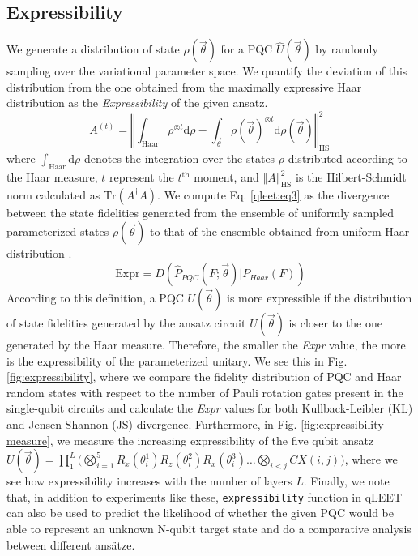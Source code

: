 \documentclass[%
 reprint,
 amsmath,
 amssymb,
 showkeys,
 pra,
 floatfix,
]{revtex4-2}
\begin{document}
\subsection{Expressibility}

We generate a distribution of state $\rho(\vec{\theta})$ for a PQC $\hat{U}(\vec{\theta})$ by randomly sampling over the variational parameter space. We quantify the deviation of this distribution from the one obtained from the maximally expressive Haar distribution as the \textit{Expressibility} of the given ansatz.
\begin{equation}\label{qleet:eq3}
    A^{(t)} =\left\Vert \int_\text{Haar}\rho^{\otimes t} \text{d}\rho - \int_{\vec{\theta}}\rho(\vec{\theta})^{\otimes t} \text{d}\rho(\vec{\theta}) \right\Vert_\text{HS}^2\,
\end{equation}
where $\int_\text{Haar}\text{d}\rho$ denotes the integration over the states $\rho$ distributed according to the Haar measure, $t$ represent the $t^{\text{th}}$ moment,  and $\left\Vert A \right\Vert_\text{HS}^2$ is the Hilbert-Schmidt norm calculated as $\text{Tr}(A^\dagger A)$. We compute Eq. \ref{qleet:eq3} as the divergence between the state fidelities generated from the ensemble of uniformly sampled parameterized states $\rho(\vec{\theta})$ to that of the ensemble obtained from uniform Haar distribution \cite{10.1002/qute.201900070}.
\begin{equation}
    \text{Expr} = D(\hat{P}_{PQC}(F; \vec{\theta}) | P_{Haar}(F))
\end{equation}
According to this definition, a PQC $U(\vec{\theta})$ is more expressible if the distribution of state fidelities generated by the ansatz circuit $U(\vec{\theta})$ is closer to the one generated by the Haar measure. Therefore, the smaller the \textit{Expr} value, the more is the expressibility of the parameterized unitary. We see this in  Fig. \ref{fig:expressibility}, where we compare the fidelity distribution of PQC and Haar random states with respect to the number of Pauli rotation gates present in the single-qubit circuits and calculate the \textit{Expr} values for both Kullback-Leibler (KL) and Jensen-Shannon (JS) divergence. Furthermore, in Fig. \ref{fig:expressibility-measure}, we measure the increasing expressibility of the five qubit ansatz $U(\vec{\theta}) =  \prod_{1}^{L}\big(\bigotimes_{i=1}^{5}R_x(\theta_i^1)R_z(\theta_i^2)R_x(\theta_i^3) \ldots \bigotimes_{i<j}CX(i, j)\big)$, where we see how expressibility increases with the number of layers $L$.  Finally, we note that, in addition to experiments like these, \texttt{expressibility} function in qLEET can also be used to predict the likelihood of whether the given PQC would be able to represent an unknown N-qubit target state and do a comparative analysis between different ansätze.
\end{document}
